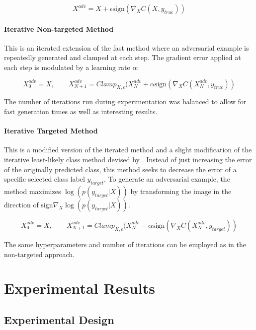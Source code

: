 \documentclass[]{article}
\begin{document}
$$X^{adv} = X + \epsilon \mbox{sign}(\nabla_{X}C(X,y_{true}))$$

\paragraph{Iterative Non-targeted Method}

This is an iterated extension of the fast method where an adversarial example is repeatedly generated and clamped at each step. The gradient error applied at each step is modulated by a learning rate $\alpha$:

\[X^{adv}_0 = X, \qquad X^{adv}_{N+1} = Clamp_{X,\epsilon}(X^{adv}_{N} + \alpha \mbox{sign}(\nabla_{X}C(X^{adv}_N,y_{true}))\]

The number of iterations run during experimentation was balanced to allow for fast generation times as well as interesting results.

\paragraph{Iterative Targeted Method}

This is a modified version of the iterated method and a slight modification of the iterative least-likely class method devised by \citep{DBLP:journals/corr/KurakinGB16}. Instead of just increasing the error of the originally predicted class, this method seeks to decrease the error of a specific selected class label $y_{target}$. To generate an adversarial example, the method maximizes $\log(p(y_{target}|X))$ by transforming the image in the direction of $\mbox{sign}\nabla_X \log(p(y_{target}|X))$.

\[X^{adv}_0 = X, \qquad X^{adv}_{N+1} = Clamp_{X,\epsilon}(X^{adv}_{N} - \alpha \mbox{sign}(\nabla_{X}C(X^{adv}_N,y_{target}))\]

The same hyperparameters and number of iterations can be employed as in the non-targeted approach.

\section{Experimental Results}

\subsection{Experimental Design}
\end{document}

